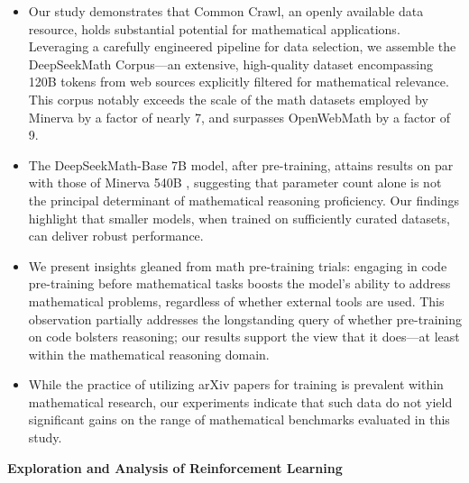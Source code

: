 \begin{itemize}[topsep=0pt]
    \item Our study demonstrates that Common Crawl, an openly available data resource, holds substantial potential for mathematical applications. Leveraging a carefully engineered pipeline for data selection, we assemble the DeepSeekMath Corpus—an extensive, high-quality dataset encompassing 120B tokens from web sources explicitly filtered for mathematical relevance. This corpus notably exceeds the scale of the math datasets employed by Minerva \citep{minerva} by a factor of nearly 7, and surpasses OpenWebMath \citep{openwebmath} by a factor of 9.

    \item The DeepSeekMath-Base 7B model, after pre-training, attains results on par with those of Minerva 540B \citep{minerva}, suggesting that parameter count alone is not the principal determinant of mathematical reasoning proficiency. Our findings highlight that smaller models, when trained on sufficiently curated datasets, can deliver robust performance.

    \item We present insights gleaned from math pre-training trials: engaging in code pre-training before mathematical tasks boosts the model's ability to address mathematical problems, regardless of whether external tools are used. This observation partially addresses the longstanding query of whether pre-training on code bolsters reasoning; our results support the view that it does—at least within the mathematical reasoning domain.

    \item While the practice of utilizing arXiv papers for training is prevalent within mathematical research, our experiments indicate that such data do not yield significant gains on the range of mathematical benchmarks evaluated in this study.
\end{itemize}

\textbf{Exploration and Analysis of Reinforcement Learning}

